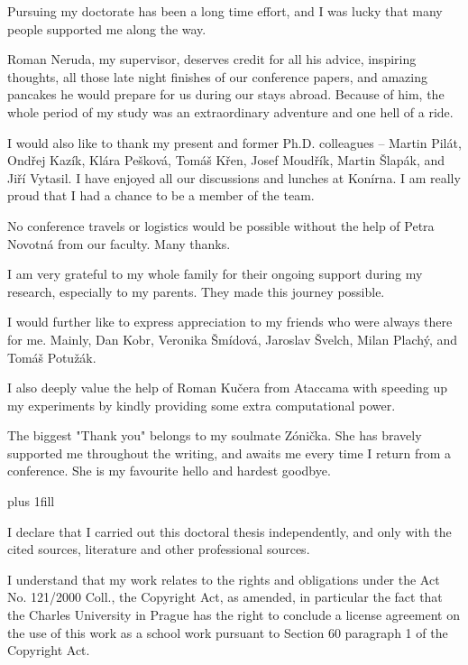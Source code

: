 \documentclass[12pt,a4paper]{report}
\let\openright=\clearpage
\begin{document}
\newpage


\openright

\noindent
Pursuing my doctorate has been a long time effort, and I was lucky that many people supported me along the way. 

Roman Neruda, my supervisor, deserves credit for all his advice, inspiring thoughts, all those late night finishes of our conference papers, and amazing pancakes he would prepare for us during our stays abroad. Because of him, the whole period of my study was an extraordinary adventure and one hell of a ride.

I would also like to thank my present and former Ph.D. colleagues -- Martin Pilát, Ondřej Kazík, Klára Pešková, Tomáš Křen, Josef Moudřík, Martin Šlapák, and Jiří Vytasil.
I have enjoyed all our discussions and lunches at Konírna. I am really proud that I had a chance to be a member of the team.

No conference travels or logistics would be possible without the help of Petra Novotná from our faculty. Many thanks.

I am very grateful to my whole family for their ongoing support during my research, especially to my parents. They made this journey possible.

I would further like to express appreciation to my friends who were always there for me. Mainly, Dan Kobr, Veronika Šmídová, Jaroslav Švelch, Milan Plachý, and Tomáš Potužák.

I also deeply value the help of Roman Kučera from Ataccama with speeding up my experiments by kindly providing some extra computational power.

The biggest "Thank you" belongs to my soulmate Zónička. She has bravely supported me throughout the writing, and awaits me every time I return from a conference. She is my favourite hello and hardest goodbye.

\newpage


\vglue 0pt plus 1fill

\noindent
I declare that I carried out this doctoral thesis independently, and only with the cited
sources, literature and other professional sources.

\medskip\noindent
I understand that my work relates to the rights and obligations under the Act No.
121/2000 Coll., the Copyright Act, as amended, in particular the fact that the Charles
University in Prague has the right to conclude a license agreement on the use of this
work as a school work pursuant to Section 60 paragraph 1 of the Copyright Act.
\end{document}
